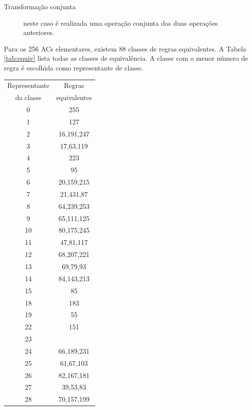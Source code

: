\documentclass[12pt,a4paper]{article}
\begin{document}
\begin{description}
\newpage

\item[Transformação conjunta] neste caso é realizada uma operação conjunta das duas
operações anteriores.

\end{description}

Para os 256 ACs elementares, existem 88 classes de regras equivalentes.
A Tabela \ref{tab:equiv} lista todas as classes de equivalência. A classe com o menor número
de regra é escolhida como representante de classe.

\begin{table}[H]
\begin{minipage}[b]{0.3\linewidth}\centering
\begin{tabular}{|c|c|}
\hline
\footnotesize Representante & \footnotesize Regras \\
{\footnotesize da classe} & \footnotesize equivalentes \\ \hline
0   & 255 \\ \hline
1   & 127 \\ \hline
2   & 16,191,247 \\ \hline
3   & 17,63,119 \\ \hline
4   & 223 \\ \hline
5   & 95 \\ \hline
6   & 20,159,215 \\ \hline
7   & 21,431,87 \\ \hline
8   & 64,239,253 \\ \hline
9   & 65,111,125 \\ \hline
10  & 80,175,245 \\ \hline
11  & 47,81,117 \\ \hline
12  & 68,207,221 \\ \hline
13  & 69,79,93 \\ \hline
14  & 84,143,213 \\ \hline
15  & 85 \\ \hline
18  & 183 \\ \hline
19  & 55 \\ \hline
22  & 151 \\ \hline
23  & \\ \hline
24  & 66,189,231 \\ \hline
25  & 61,67,103 \\ \hline
26  & 82,167,181 \\ \hline
27  & 39,53,83 \\ \hline
28  & 70,157,199 \\ \hline

\end{tabular}
\end{minipage}
\end{table}
\end{document}
